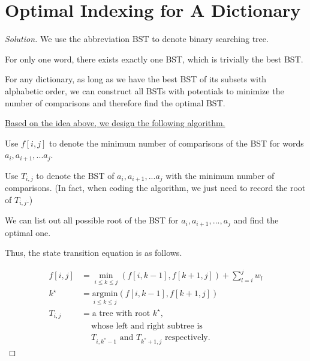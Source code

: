 \documentclass{article}
\newenvironment{solution}{\begin{proof}[\noindent\it Solution]}{\end{proof}}
\begin{document}
\vspace{1em}
\section{Optimal Indexing for A Dictionary}
\vspace{1em}
\begin{solution}
    We use the abbreviation BST to denote binary searching tree.
    
    \hspace{2.6em}
    For only one word, there exists exactly one BST, which is trivially the best BST. 
    
    \hspace{2.6em}
    For any dictionary, as long as we have the best BST of its subsets with alphabetic order, we can construct all BSTs with potentials to minimize the number of comparisons and therefore find the optimal BST. 
    
    \vspace{2em} \hspace{-2em}
    \underline{Based on the idea above, we design the following algorithm.}
    
    \vspace{1em} \hspace{1em}
    Use $f[i,j]$ to denote the minimum number of comparisons of the BST for words $a_i, a_{i+1}, ... a_j$. 
    
    \hspace{1em}
    Use $T_{i,j}$ to denote the BST of $a_i, a_{i+1}, ... a_j$ with the minimum number of comparisons. (In fact, when coding the algorithm, we just need to record the root of $T_{i,j}$.)
    
    \hspace{1em}
    We can list out all possible root of the BST for $a_i,a_{i+1},...,a_j$ and find the optimal one. 
    
    \hspace{1em}
    Thus, the state transition equation is as follows.
    
    \vspace{-2em}
    \begin{align*}
        f[i,j]&=\underset{i\le k\le j}{\min}(f[i,k-1],f[k+1,j])+\sum_{l=i}^jw_l \\
        k^\star &= \underset{i\le k\le j}{\mathrm{argmin}}(f[i,k-1],f[k+1,j]) \\
        T_{i,j} &= \text{a tree with root $k^\star$,} \\
        &\quad\ \text{whose left and right subtree is}\\
        &\quad\ T_{i,k^*-1}\text{ and }T_{k^*+1,j}\text{ respectively.}
    \end{align*}
    

\end{solution}
\end{document}
